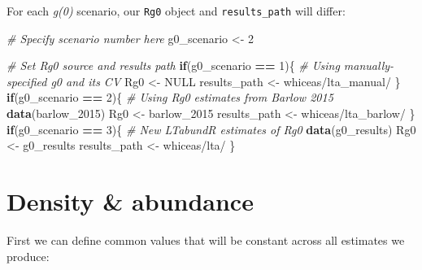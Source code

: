 \documentclass[
]{book}
\newenvironment{Shaded}{\begin{snugshade}}{\end{snugshade}}
\newcommand{\CommentTok}[1]{\textcolor[rgb]{0.56,0.35,0.01}{\textit{#1}}}
\newcommand{\ConstantTok}[1]{\textcolor[rgb]{0.56,0.35,0.01}{#1}}
\newcommand{\ControlFlowTok}[1]{\textcolor[rgb]{0.13,0.29,0.53}{\textbf{#1}}}
\newcommand{\DecValTok}[1]{\textcolor[rgb]{0.00,0.00,0.81}{#1}}
\newcommand{\FunctionTok}[1]{\textcolor[rgb]{0.13,0.29,0.53}{\textbf{#1}}}
\newcommand{\NormalTok}[1]{#1}
\newcommand{\OtherTok}[1]{\textcolor[rgb]{0.56,0.35,0.01}{#1}}
\newcommand{\SpecialCharTok}[1]{\textcolor[rgb]{0.81,0.36,0.00}{\textbf{#1}}}
\newcommand{\StringTok}[1]{\textcolor[rgb]{0.31,0.60,0.02}{#1}}
\begin{document}
For each \emph{g(0)} scenario, our \texttt{Rg0} object and \texttt{results\_path} will differ:

\begin{Shaded}
\begin{Highlighting}[]
\CommentTok{\# Specify scenario number here}
\NormalTok{g0\_scenario }\OtherTok{\textless{}{-}} \DecValTok{2}
\end{Highlighting}
\end{Shaded}

\begin{Shaded}
\begin{Highlighting}[]
\CommentTok{\# Set Rg0 source and results path}
\ControlFlowTok{if}\NormalTok{(g0\_scenario }\SpecialCharTok{==} \DecValTok{1}\NormalTok{)\{ }\CommentTok{\# Using manually{-}specified g0 and its CV}
\NormalTok{  Rg0 }\OtherTok{\textless{}{-}} \ConstantTok{NULL}
\NormalTok{  results\_path }\OtherTok{\textless{}{-}} \StringTok{\textquotesingle{}whiceas/lta\_manual/\textquotesingle{}}
\NormalTok{\}}
\ControlFlowTok{if}\NormalTok{(g0\_scenario }\SpecialCharTok{==} \DecValTok{2}\NormalTok{)\{ }\CommentTok{\# Using Rg0 estimates from Barlow 2015}
  \FunctionTok{data}\NormalTok{(barlow\_2015)}
\NormalTok{  Rg0 }\OtherTok{\textless{}{-}}\NormalTok{ barlow\_2015}
\NormalTok{  results\_path }\OtherTok{\textless{}{-}} \StringTok{\textquotesingle{}whiceas/lta\_barlow/\textquotesingle{}}
\NormalTok{\}}
\ControlFlowTok{if}\NormalTok{(g0\_scenario }\SpecialCharTok{==} \DecValTok{3}\NormalTok{)\{ }\CommentTok{\# New LTabundR estimates of Rg0}
  \FunctionTok{data}\NormalTok{(g0\_results)}
\NormalTok{  Rg0 }\OtherTok{\textless{}{-}}\NormalTok{ g0\_results}
\NormalTok{  results\_path }\OtherTok{\textless{}{-}} \StringTok{\textquotesingle{}whiceas/lta/\textquotesingle{}}
\NormalTok{\}}
\end{Highlighting}
\end{Shaded}

\hypertarget{density-abundance}{%
\section*{Density \& abundance}\label{density-abundance}}

First we can define common values that will be constant across all estimates we produce:
\end{document}
